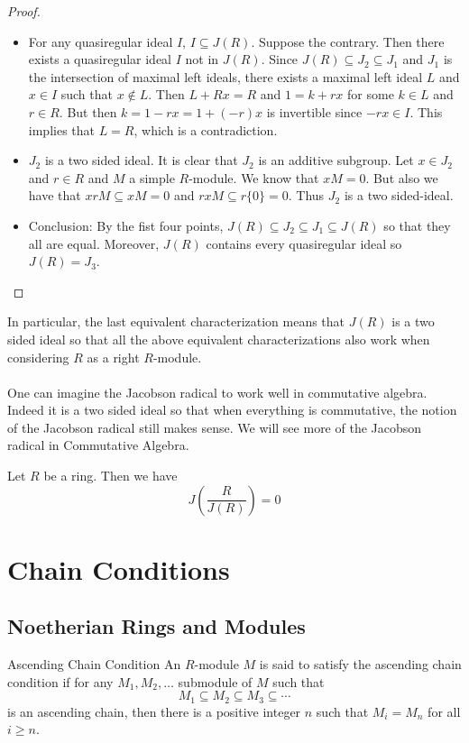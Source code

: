 \documentclass[a4paper]{article}
\begin{document}
\begin{thm}{}{}
\begin{proof}
\begin{itemize}
\item For any quasiregular ideal $I$, $I\subseteq J(R)$. Suppose the contrary. Then there exists a quasiregular ideal $I$ not in $J(R)$. Since $J(R)\subseteq J_2\subseteq J_1$ and $J_1$ is the intersection of maximal left ideals, there exists a maximal left ideal $L$ and $x\in I$ such that $x\notin L$. Then $L+Rx=R$ and $1=k+rx$ for some $k\in L$ and $r\in R$. But then $k=1-rx=1+(-r)x$ is invertible since $-rx\in I$. This implies that $L=R$, which is a contradiction. 

\item $J_2$ is a two sided ideal. It is clear that $J_2$ is an additive subgroup. Let $x\in J_2$ and $r\in R$ and $M$ a simple $R$-module. We know that $xM=0$. But also we have that $xrM\subseteq xM=0$ and $rxM\subseteq r\{0\}=0$. Thus $J_2$ is a two sided-ideal. 

\item Conclusion: By the fist four points, $J(R)\subseteq J_2\subseteq J_1\subseteq J(R)$ so that they all are equal. Moreover, $J(R)$ contains every quasiregular ideal so $J(R)=J_3$. 
\end{itemize}
\end{proof}
\end{thm}

In particular, the last equivalent characterization means that $J(R)$ is a two sided ideal so that all the above equivalent characterizations also work when considering $R$ as a right $R$-module. \\~\\

One can imagine the Jacobson radical to work well in commutative algebra. Indeed it is a two sided ideal so that when everything is commutative, the notion of the Jacobson radical still makes sense. We will see more of the Jacobson radical in Commutative Algebra. 

\begin{lmm}{}{} Let $R$ be a ring. Then we have $$J\left(\frac{R}{J(R)}\right)=0$$
\end{lmm}

\pagebreak
\section{Chain Conditions}
\subsection{Noetherian Rings and Modules}
\begin{defn}{Ascending Chain Condition}{} An $R$-module $M$ is said to satisfy the ascending chain condition if for any $M_1,M_2,\dots$ submodule of $M$ such that $$M_1\subseteq M_2\subseteq M_3\subseteq\cdots$$ is an ascending chain, then there is a positive integer $n$ such that $M_i=M_n$ for all $i\geq n$. 
\end{defn}
\end{document}
